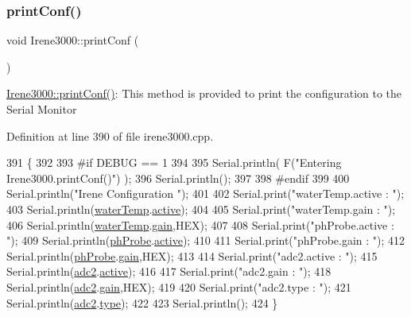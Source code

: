 \subsubsection{\texorpdfstring{print\+Conf()}{printConf()}}
{\footnotesize\ttfamily void Irene3000\+::print\+Conf (\begin{DoxyParamCaption}{ }\end{DoxyParamCaption})}

\hyperlink{class_irene3000_a7bc2414100b5e19eacc6630fa34b2654}{Irene3000\+::print\+Conf()}\+: This method is provided to print the configuration to the Serial Monitor 

Definition at line 390 of file irene3000.\+cpp.


\begin{DoxyCode}
391 \{
392 
393 \textcolor{preprocessor}{#if DEBUG == 1 }
394 
395     Serial.println( F(\textcolor{stringliteral}{"Entering Irene3000.printConf()"}) );
396     Serial.println();
397 
398 \textcolor{preprocessor}{#endif }
399 
400     Serial.println(\textcolor{stringliteral}{"Irene Configuration "});
401 
402     Serial.print(\textcolor{stringliteral}{"waterTemp.active : "});
403     Serial.println(\hyperlink{class_irene3000_af05612c78c758ce9db316c75ad937130}{waterTemp}.\hyperlink{struct_irene3000_1_1state_a879828ace7e7a7bc91ff703bfee36599}{active});
404 
405     Serial.print(\textcolor{stringliteral}{"waterTemp.gain : "});
406     Serial.println(\hyperlink{class_irene3000_af05612c78c758ce9db316c75ad937130}{waterTemp}.\hyperlink{struct_irene3000_1_1state_a1ecf69d38cb31ecaf6b3602a3f3e93cb}{gain},HEX);    
407 
408     Serial.print(\textcolor{stringliteral}{"phProbe.active : "});
409     Serial.println(\hyperlink{class_irene3000_a997a4ee466fa1d5416e07e444965dc9e}{phProbe}.\hyperlink{struct_irene3000_1_1state_a879828ace7e7a7bc91ff703bfee36599}{active});
410 
411     Serial.print(\textcolor{stringliteral}{"phProbe.gain : "});
412     Serial.println(\hyperlink{class_irene3000_a997a4ee466fa1d5416e07e444965dc9e}{phProbe}.\hyperlink{struct_irene3000_1_1state_a1ecf69d38cb31ecaf6b3602a3f3e93cb}{gain},HEX);
413     
414     Serial.print(\textcolor{stringliteral}{"adc2.active : "});
415     Serial.println(\hyperlink{class_irene3000_aae3a95a1c83c766cd2f299ce471c337e}{adc2}.\hyperlink{struct_irene3000_1_1state_a879828ace7e7a7bc91ff703bfee36599}{active});
416 
417     Serial.print(\textcolor{stringliteral}{"adc2.gain : "});
418     Serial.println(\hyperlink{class_irene3000_aae3a95a1c83c766cd2f299ce471c337e}{adc2}.\hyperlink{struct_irene3000_1_1state_a1ecf69d38cb31ecaf6b3602a3f3e93cb}{gain},HEX);
419 
420     Serial.print(\textcolor{stringliteral}{"adc2.type : "});
421     Serial.println(\hyperlink{class_irene3000_aae3a95a1c83c766cd2f299ce471c337e}{adc2}.\hyperlink{struct_irene3000_1_1state_a9897a7e02727db6351d44006eec73799}{type});
422 
423     Serial.println();
424 \}
\end{DoxyCode}
